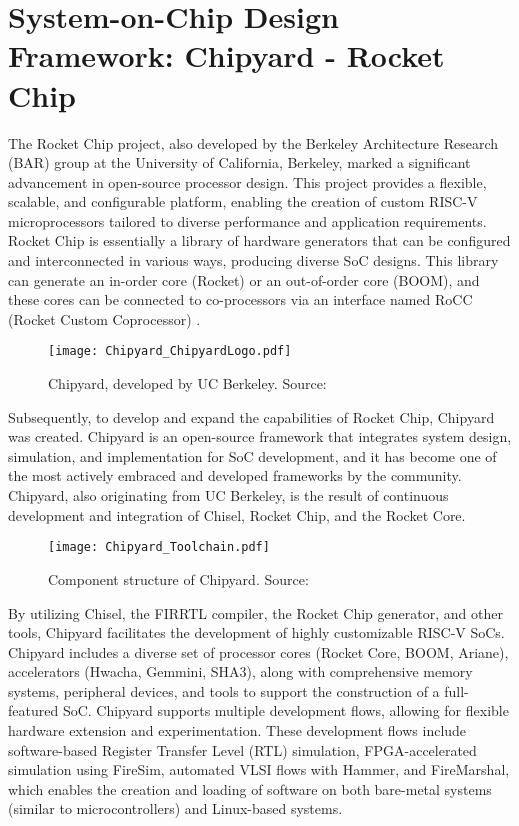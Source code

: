 \section{System-on-Chip Design Framework: Chipyard - Rocket Chip}

The Rocket Chip project, also developed by the Berkeley Architecture Research (BAR) group at the University of California, Berkeley, marked a significant advancement in open-source processor design. This project provides a flexible, scalable, and configurable platform, enabling the creation of custom RISC-V microprocessors tailored to diverse performance and application requirements. Rocket Chip is essentially a library of hardware generators that can be configured and interconnected in various ways, producing diverse SoC designs. This library can generate an in-order core (Rocket) or an out-of-order core (BOOM), and these cores can be connected to co-processors via an interface named RoCC (Rocket Custom Coprocessor) \cite{asanovic2016rocket}.

\begin{figure}[h!]
    \centering
    \texttt{[image: Chipyard\_ChipyardLogo.pdf]} 
    \caption{Chipyard, developed by UC Berkeley. Source: \cite{zhao2021chipyard}}
    \label{fig:chipyard_ucb}
\end{figure}

Subsequently, to develop and expand the capabilities of Rocket Chip, Chipyard was created. Chipyard is an open-source framework that integrates system design, simulation, and implementation for SoC development, and it has become one of the most actively embraced and developed frameworks by the community. Chipyard, also originating from UC Berkeley, is the result of continuous development and integration of Chisel, Rocket Chip, and the Rocket Core.

\begin{figure}[h!]
    \centering
    \texttt{[image: Chipyard\_Toolchain.pdf]}
    \caption{Component structure of Chipyard. Source: \cite{zhao2021chipyard}}
    \label{fig:chipyard_structure}
\end{figure}

By utilizing Chisel, the FIRRTL compiler, the Rocket Chip generator, and other tools, Chipyard facilitates the development of highly customizable RISC-V SoCs. Chipyard includes a diverse set of processor cores (Rocket Core, BOOM, Ariane), accelerators (Hwacha, Gemmini, SHA3), along with comprehensive memory systems, peripheral devices, and tools to support the construction of a full-featured SoC. Chipyard supports multiple development flows, allowing for flexible hardware extension and experimentation. These development flows include software-based Register Transfer Level (RTL) simulation, FPGA-accelerated simulation using FireSim, automated VLSI flows with Hammer, and FireMarshal, which enables the creation and loading of software on both bare-metal systems (similar to microcontrollers) and Linux-based systems.


